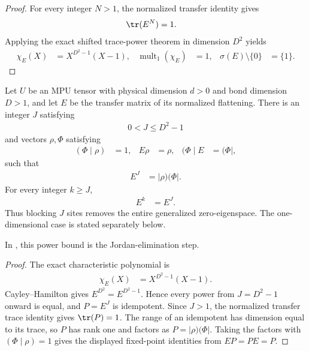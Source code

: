 \begin{proof}\leanok
    For every integer $N>1$, the normalized transfer identity gives
    \begin{align}
        \tr(E^N) & =1.
    \end{align}
    Applying the exact shifted trace-power theorem in dimension $D^2$ yields
    \begin{align}
        \chi_E(X) & =X^{D^2-1}(X-1),
                  & \operatorname{mult}_{1}(\chi_E) & =1,
                  & \sigma(E)\setminus\{0\}         & =\{1\}.
    \end{align}
\end{proof}

\begin{lemma}
    \label{thm:mpu_normalized_transfer_stabilization}
    \leanok
    Let $U$ be an MPU tensor with physical dimension $d>0$ and bond
    dimension $D>1$, and let $E$ be the transfer matrix of its normalized
    flattening. There is an integer
    $J$ satisfying
    \begin{align}
        0<J\leq D^2-1
    \end{align}
    and vectors $\rho,\Phi$ satisfying
    \begin{align}
        (\Phi\mid\rho) & =1,
                       & E\rho       & =\rho,
                       & (\Phi\mid E & =(\Phi\mid,
    \end{align}
    such that
    \begin{align}
        E^J & =\lvert\rho)(\Phi\rvert.
    \end{align}
    For every integer $k\geq J$,
    \begin{align}
        E^k & =E^J.
    \end{align}
    Thus blocking $J$ sites removes the entire generalized zero-eigenspace.
    The one-dimensional case is stated separately below.

    In \cite[proof of Proposition~III.2(ii)]{Cirac2017MPU}, this power bound is the Jordan-elimination
    step.
\end{lemma}

\begin{proof}\leanok
    The exact characteristic polynomial is
    \begin{align}
        \chi_E(X) & =X^{D^2-1}(X-1).
    \end{align}
    Cayley--Hamilton gives $E^{D^2}=E^{D^2-1}$. Hence every power from
    $J=D^2-1$ onward is equal, and $P=E^J$ is idempotent. Since $J>1$, the
    normalized transfer trace identity gives $\tr(P)=1$. The range of an
    idempotent has dimension equal to its trace, so $P$ has rank one and
    factors as $P=\lvert\rho)(\Phi\rvert$. Taking the factors with
    $(\Phi\mid\rho)=1$ gives the displayed fixed-point identities from
    $EP=PE=P$.
\end{proof}

